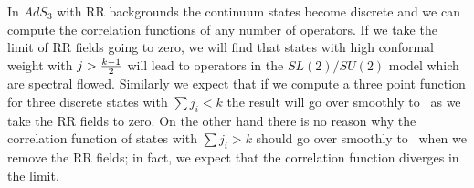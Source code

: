 In $AdS_3$ with RR backgrounds the continuum states
 become discrete and we can compute the correlation functions
of any number of operators.
If we take the limit of RR fields going to zero, we will find
that  states with high conformal weight with
 $j> {k-1 \over 2} $ will lead to operators in the
$SL(2)/SU(2)$ model which are spectral flowed.
Similarly we expect that if we compute a three point function for
three discrete states with $\sum j_i <k$ the result will go over
smoothly to \teschnerthree\ as we take the RR fields to zero.
On the other hand there is no reason why the correlation function
of states with $\sum j_i >k$ should go over smoothly to
\teschnerthree\ when we remove the RR fields; in fact, we expect
that the correlation function diverges in the limit.



